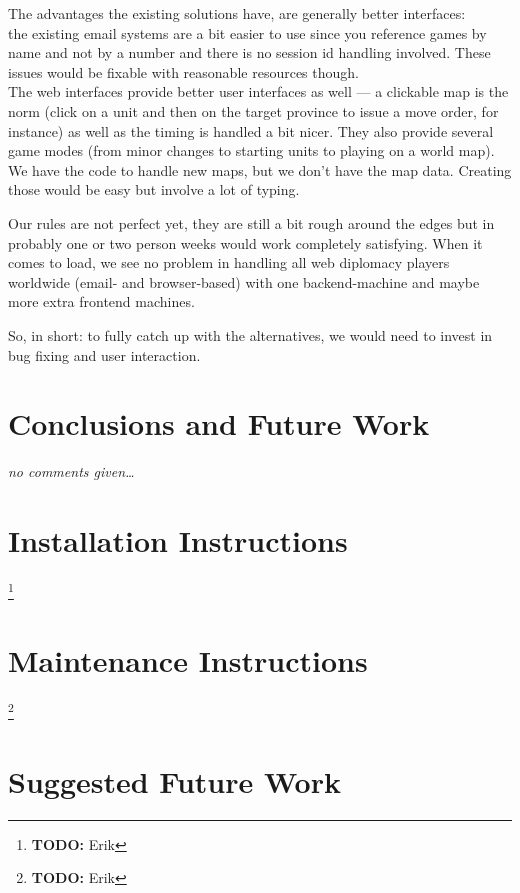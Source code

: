 \documentclass[11pt,a4paper]{report}
\newcommand{\hi}[1]{{\color{red}\em #1\/}\\}
\newcommand{\todo}[1]{\footnote{{\color{red} {\bf TODO:} #1}}}
\begin{document}
The advantages the existing solutions have, are generally better interfaces: \\
the existing email systems are a bit easier to use since you reference games by
name and not by a number and there is no session id handling involved.
These issues would be fixable with reasonable resources though. \\
The web interfaces provide better user interfaces as well --- a clickable map
is the norm (click on a unit and then on the target province to issue a move
order, for instance) as well as the timing is handled a bit nicer. They also
provide several game modes (from minor changes to starting units to playing on
a world map). We have the code to handle new maps, but we don't have the map
data. Creating those would be easy but involve a lot of typing.

Our rules are not perfect yet, they are still a bit rough around the edges but
in probably one or two person weeks would work completely satisfying.
When it comes to load, we see no problem in handling all web diplomacy
players worldwide (email- and browser-based) with one backend-machine and maybe more extra frontend machines.

So, in short: to fully catch up with the alternatives, we would need to invest
in bug fixing and user interaction.

\chapter{Conclusions and Future Work}
\hi{no comments given\ldots}

\appendix
\chapter{Installation Instructions}
\todo{Erik}

\chapter{Maintenance Instructions}
\todo{Erik}

\chapter{Suggested Future Work}
\end{document}
